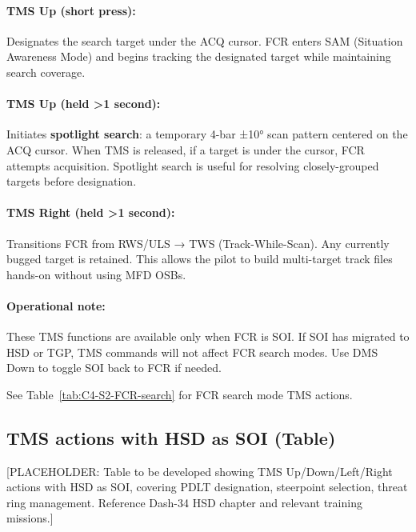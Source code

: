 \documentclass[11pt, a4paper, twoside]{report}
\begin{document}
\paragraph{TMS Up (short press):}
Designates the search target under the ACQ cursor. FCR enters SAM (Situation Awareness Mode) and begins tracking the designated target while maintaining search coverage.

\paragraph{TMS Up (held >1 second):}
Initiates \textbf{spotlight search}: a temporary 4-bar ±10° scan pattern centered on the ACQ cursor. When TMS is released, if a target is under the cursor, FCR attempts acquisition. Spotlight search is useful for resolving closely-grouped targets before designation.

\paragraph{TMS Right (held >1 second):}
Transitions FCR from RWS/ULS → TWS (Track-While-Scan). Any currently bugged target is retained. This allows the pilot to build multi-target track files hands-on without using MFD OSBs.

\paragraph{Operational note:}
These TMS functions are available only when FCR is SOI. If SOI has migrated to HSD or TGP, TMS commands will not affect FCR search modes. Use DMS Down to toggle SOI back to FCR if needed.

See Table~\ref{tab:C4-S2-FCR-search} for FCR search mode TMS actions.

\subsection{TMS actions with HSD as SOI (Table)}
\label{sec:C4-S2-S3}

[PLACEHOLDER: Table to be developed showing TMS Up/Down/Left/Right actions with HSD as SOI, covering PDLT designation, steerpoint selection, threat ring management. Reference Dash-34 HSD chapter and relevant training missions.]
\end{document}
